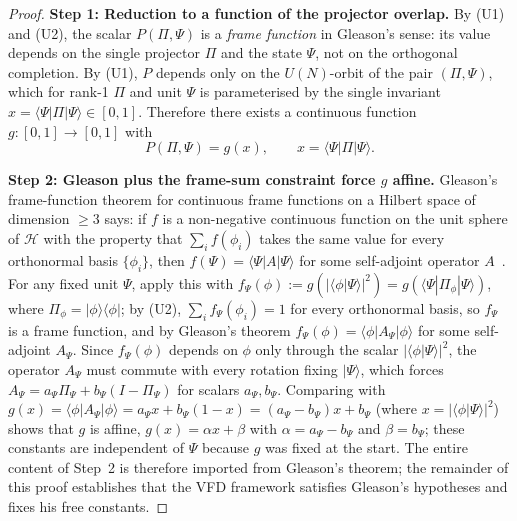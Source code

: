 \documentclass[12pt]{article}
\newcommand{\Hcal}{\mathcal{H}}
\begin{document}
\begin{proof}
\textbf{Step 1: Reduction to a function of the projector overlap.} By (U1) and (U2), the scalar $P(\Pi, \Psi)$ is a \emph{frame function} in Gleason's sense: its value depends on the single projector $\Pi$ and the state $\Psi$, not on the orthogonal completion. By (U1), $P$ depends only on the $U(N)$-orbit of the pair $(\Pi, \Psi)$, which for rank-1 $\Pi$ and unit $\Psi$ is parameterised by the single invariant $x = \langle\Psi | \Pi | \Psi\rangle \in [0,1]$. Therefore there exists a continuous function $g: [0,1] \to [0,1]$ with
\begin{equation}
    P(\Pi, \Psi) = g(x), \qquad x = \langle\Psi|\Pi|\Psi\rangle.
\end{equation}

\textbf{Step 2: Gleason plus the frame-sum constraint force $g$ affine.} Gleason's frame-function theorem for continuous frame functions on a Hilbert space of dimension $\geq 3$ says: if $f$ is a non-negative continuous function on the unit sphere of $\Hcal$ with the property that $\sum_i f(\phi_i)$ takes the same value for every orthonormal basis $\{\phi_i\}$, then $f(\Psi) = \langle\Psi|A|\Psi\rangle$ for some self-adjoint operator $A$~\citep{Gleason1957,Peres1995,CookKeaneMoran1985}. For any fixed unit $\Psi$, apply this with $f_\Psi(\phi) := g(|\langle\phi|\Psi\rangle|^2) = g(\langle\Psi|\Pi_\phi|\Psi\rangle)$, where $\Pi_\phi = |\phi\rangle\langle\phi|$; by (U2), $\sum_i f_\Psi(\phi_i) = 1$ for every orthonormal basis, so $f_\Psi$ is a frame function, and by Gleason's theorem $f_\Psi(\phi) = \langle\phi|A_\Psi|\phi\rangle$ for some self-adjoint $A_\Psi$. Since $f_\Psi(\phi)$ depends on $\phi$ only through the scalar $|\langle\phi|\Psi\rangle|^2$, the operator $A_\Psi$ must commute with every rotation fixing $|\Psi\rangle$, which forces $A_\Psi = a_\Psi \Pi_\Psi + b_\Psi (I - \Pi_\Psi)$ for scalars $a_\Psi, b_\Psi$. Comparing with $g(x) = \langle\phi|A_\Psi|\phi\rangle = a_\Psi x + b_\Psi(1-x) = (a_\Psi - b_\Psi) x + b_\Psi$ (where $x = |\langle\phi|\Psi\rangle|^2$) shows that $g$ is affine, $g(x) = \alpha x + \beta$ with $\alpha = a_\Psi - b_\Psi$ and $\beta = b_\Psi$; these constants are independent of $\Psi$ because $g$ was fixed at the start. The entire content of Step~2 is therefore imported from Gleason's theorem; the remainder of this proof establishes that the VFD framework satisfies Gleason's hypotheses and fixes his free constants.


\end{proof}
\end{document}
